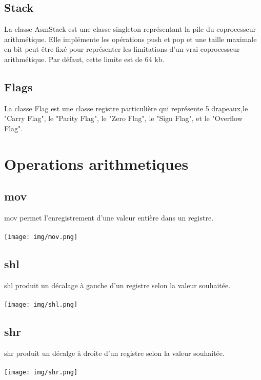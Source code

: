 \documentclass{article}
\begin{document}
\subsection{Stack}

La classe AsmStack est une classe singleton représentant la pile du coprocesseur arithmétique. Elle implémente les opérations push et pop et
une taille maximale en bit peut être fixé pour représenter les limitations d'un vrai coprocesseur arithmétique. Par défaut, cette limite est de 64 kb.

\subsection{Flags}

La classe Flag est une classe registre particulière qui représente 5 drapeaux,le "Carry Flag", le "Parity Flag", le "Zero Flag", le "Sign Flag", et le "Overflow Flag".

\section{Operations arithmetiques}
\subsection{mov}
mov permet l'enregistrement d'une valeur entière dans un registre.
\\
\\
\texttt{[image: img/mov.png]}

\subsection{shl}
shl produit un décalage à gauche d'un registre selon la valeur souhaitée.
\\
\\
\texttt{[image: img/shl.png]}

\subsection{shr}
shr produit un décalge à droite d'un registre selon la valeur souhaitée.
\\
\\
\texttt{[image: img/shr.png]}
\end{document}
